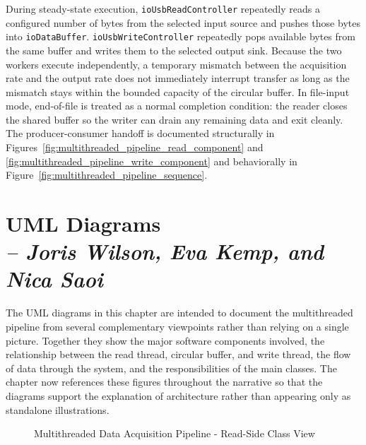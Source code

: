 During steady-state execution, \texttt{ioUsbReadController} repeatedly reads a configured number of bytes from the selected input source and pushes those bytes into \texttt{ioDataBuffer}. \texttt{ioUsbWriteController} repeatedly pops available bytes from the same buffer and writes them to the selected output sink. Because the two workers execute independently, a temporary mismatch between the acquisition rate and the output rate does not immediately interrupt transfer as long as the mismatch stays within the bounded capacity of the circular buffer. In file-input mode, end-of-file is treated as a normal completion condition: the reader closes the shared buffer so the writer can drain any remaining data and exit cleanly. The producer-consumer handoff is documented structurally in Figures~\ref{fig:multithreaded_pipeline_read_component} and \ref{fig:multithreaded_pipeline_write_component} and behaviorally in Figure~\ref{fig:multithreaded_pipeline_sequence}.

\section{UML Diagrams \\
\small{\textit{-- Joris Wilson, Eva Kemp, and Nica Saoi}}}
\label{Section::UML Diagrams}

The UML diagrams in this chapter are intended to document the multithreaded pipeline from several complementary viewpoints rather than relying on a single picture. Together they show the major software components involved, the relationship between the read thread, circular buffer, and write thread, the flow of data through the system, and the responsibilities of the main classes. The chapter now references these figures throughout the narrative so that the diagrams support the explanation of architecture rather than appearing only as standalone illustrations.

\begin{figure}[!htbp]
  \centering
  \caption{Multithreaded Data Acquisition Pipeline - Read-Side Class View}
  \label{fig:multithreaded_pipeline_read_class}
\end{figure}

